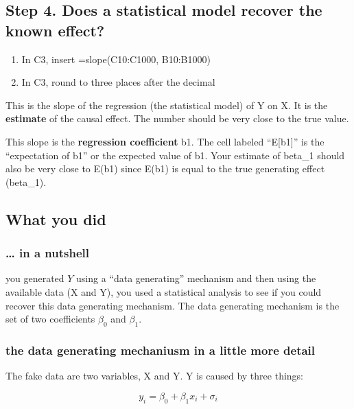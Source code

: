 \documentclass[]{book}
\providecommand{\tightlist}{%
  \setlength{\itemsep}{0pt}\setlength{\parskip}{0pt}}
\begin{document}
\subsection{Step 4. Does a statistical model recover the known
effect?}\label{step-4.-does-a-statistical-model-recover-the-known-effect}

\begin{enumerate}
\def\labelenumi{\arabic{enumi}.}
\tightlist
\item
  In C3, insert =slope(C10:C1000, B10:B1000)
\item
  In C3, round to three places after the decimal
\end{enumerate}

This is the slope of the regression (the statistical model) of Y on X.
It is the \textbf{estimate} of the causal effect. The number should be
very close to the true value.

This slope is the \textbf{regression coefficient} b1. The cell labeled
``E{[}b1{]}'' is the ``expectation of b1'' or the expected value of b1.
Your estimate of beta\_1 should also be very close to E(b1) since E(b1)
is equal to the true generating effect (beta\_1).

\subsection{What you did}\label{what-you-did}

\subsubsection{\ldots{} in a nutshell}\label{in-a-nutshell}

you generated \(Y\) using a ``data generating'' mechanism and then using
the available data (X and Y), you used a statistical analysis to see if
you could recover this data generating mechanism. The data generating
mechanism is the set of two coefficients \(\beta_0\) and \(\beta_1\).

\subsubsection{the data generating mechaniusm in a little more
detail}\label{the-data-generating-mechaniusm-in-a-little-more-detail}

The fake data are two variables, X and Y. Y is caused by three things:

\begin{equation}
y_i = \beta_0 + \beta_1 x_i + \sigma_i
\end{equation}
\end{document}
